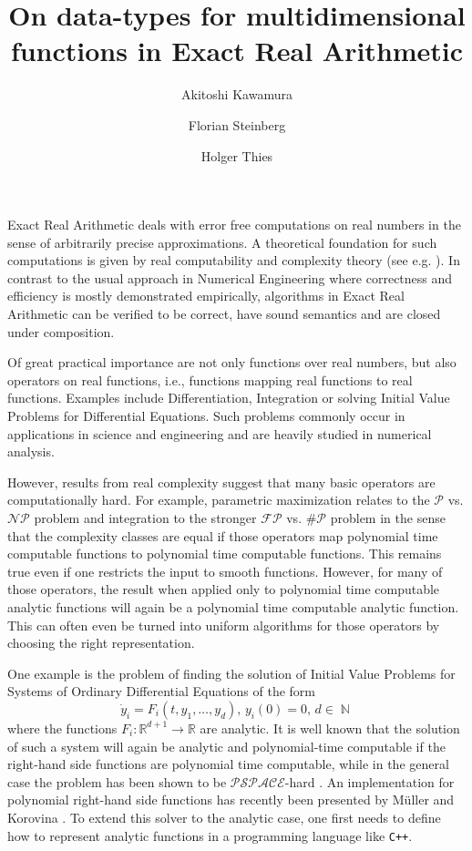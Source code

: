 \documentclass{article}
\author[1]{Akitoshi Kawamura}
\author[1,2]{Florian Steinberg}
\author[1]{Holger Thies}
\title{On data-types for multidimensional functions in Exact Real Arithmetic}
\affil[1]{The University of Tokyo}
\affil[2]{TU Darmstadt}
\date{}
\newcommand{\RR}{\mathbb R}
\DeclareMathOperator{\NN}{\mathbb N}
\newcommand{\p}{\ensuremath{\mathcal P}\xspace}
\newcommand{\np}{\ensuremath{\mathcal{NP}}\xspace}
\newcommand{\fp}{\ensuremath{\mathcal{FP}}\xspace}
\newcommand{\sharpp}{\ensuremath{\# \mathcal{P}}\xspace}
\newcommand{\pspace}{\ensuremath{ \mathcal{PSPACE}}\xspace}
\newcommand{\cc}{\texttt{C++}\xspace}
\begin{document}
\maketitle
Exact Real Arithmetic deals with error free computations on real numbers in the sense of arbitrarily precise approximations. 
A theoretical foundation for such computations is given by real computability and complexity theory (see e.g. \cite{MR0089809, MR1137517,Weihrauch}).
In contrast to the usual approach in Numerical Engineering where correctness and efficiency is mostly demonstrated empirically, algorithms in Exact Real Arithmetic can be verified to be correct, have sound semantics and are closed under composition.


Of great practical importance are not only functions over real numbers, but also operators on real functions, i.e., functions mapping real functions to real functions.
Examples include Differentiation, Integration or solving Initial Value Problems for Differential Equations.
Such problems commonly occur in applications in science and engineering and are heavily studied in numerical analysis.

However, results from real complexity suggest that many basic operators are computationally hard. 
For example, parametric maximization relates to the $\p$ vs. $\np$ problem \cite{MR666209} and integration to the stronger $\fp$ vs. $\sharpp$ problem \cite{MR748898} in the sense that the complexity classes are equal if those operators map polynomial time computable functions to polynomial time computable functions.
This remains true even if one restricts the input to smooth functions.
However, for many of those operators, the result when applied only to polynomial time computable analytic functions will again be a polynomial time computable analytic function.
This can often even be turned into uniform algorithms for those operators by choosing the right representation.

One example is the problem of finding the solution of Initial Value Problems for Systems of Ordinary Differential Equations of the form 
$$ \dot y_i = F_i(t, y_1, \dots, y_d),\,y_i(0)=0,\, d \in \NN$$
where the functions $F_i : \RR^{d+1} \to \RR$ are analytic.
It is well known that the solution of such a system will again be analytic and polynomial-time computable if the right-hand side functions are polynomial time computable, while in the general case the problem has been shown to be \pspace-hard \cite{Kawamura10}.
An implementation for polynomial right-hand side functions has recently been presented by M\"{u}ller and Korovina \cite{DBLP:journals/corr/abs-1006-0401}.
To extend this solver to the analytic case, one first needs to define how to represent analytic functions in a programming language like \cc.
\end{document}
